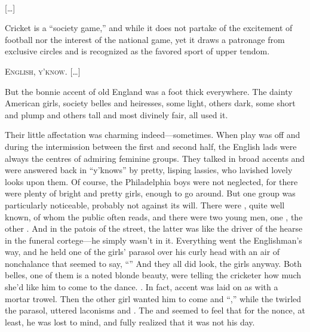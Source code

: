 \begin{ipquote}
\begin{center}
\\
{[…]}
\end{center}
{Cricket is a “society game,” and while it do{\kern0pt}es not partake of the excitement of football nor the interest of the national game, yet it draws a patronage from exclusive circles and is recognized as the favored sport of upper tendom.

\centering {[…]} \textsc{English, y’know.} {[…]}

But the bonnie accent of old England was a foot thick everywhere. The dainty American girls, society belles and heiresses, some light, others dark, some short and plump and others tall and most divinely fair, all used it.} Their little affectation was charming indeed—sometimes. When play was off and during the intermission between the first and second half, the English lads were always the centres of admiring feminine groups. They talked in broad accents and were answered back in “y’knows” by pretty, lisping lassies, who lavished lovely looks upon them. Of course, the Philadelphia boys were not neglected, for there were plenty of bright and pretty girls, enough to go around. But one group was particularly noticeable, probably not against its will. There were , quite well known, of whom the public often reads, and there were two young men, one , the other . And in the patois of the street, the latter was like the driver of the hearse in the funeral cortege—he simply wasn’t in it. Everything went the Englishman’s way, and he held one of the girls’ parasol over his curly head with an air of nonchalance that seemed to say, “” And they all did look, the girls anyway. Both belles, one of them is a noted blonde beauty, were telling the cricketer how much she’d like him to come to the dance. . In fact, accent was laid on as with a mortar trowel. Then the other girl wanted him to come and “,” while the  twirled the parasol, uttered laconisms and . The  and seemed to feel that for the nonce, at least, he was lost to mind, and fully realized that it was not his day.


\end{ipquote}
